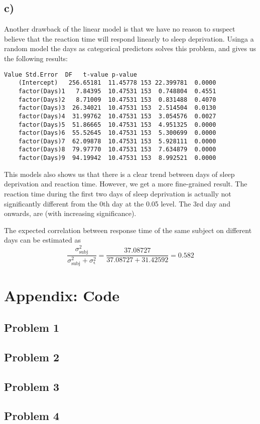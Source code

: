 \documentclass[a4paper, twocolumn]{article}
\begin{document}
\subsection*{c)}
Another drawback of the linear model is that we have no reason to suspect believe that the reaction time will respond linearly to sleep deprivation. Usinga a random model the days as categorical predictors solves this problem, and gives us the following results:
\begin{Verbatim}[fontsize=\scriptsize]
                    Value Std.Error  DF   t-value p-value
    (Intercept)   256.65181  11.45778 153 22.399781  0.0000
    factor(Days)1   7.84395  10.47531 153  0.748804  0.4551
    factor(Days)2   8.71009  10.47531 153  0.831488  0.4070
    factor(Days)3  26.34021  10.47531 153  2.514504  0.0130
    factor(Days)4  31.99762  10.47531 153  3.054576  0.0027
    factor(Days)5  51.86665  10.47531 153  4.951325  0.0000
    factor(Days)6  55.52645  10.47531 153  5.300699  0.0000
    factor(Days)7  62.09878  10.47531 153  5.928111  0.0000
    factor(Days)8  79.97770  10.47531 153  7.634879  0.0000
    factor(Days)9  94.19942  10.47531 153  8.992521  0.0000
\end{Verbatim}

This models also shows us that there is a clear trend between days of sleep deprivation and reaction time. However, we get a more fine-grained result. The reaction time during the first two days of sleep deprivation is actually not significantly different from the 0th day at the 0.05 level. The 3rd day and onwards, are (with increasing significance).

The expected correlation between response time of the same subject on different days can be estimated as
\begin{equation}
    \frac{\sigma_\mathrm{subj}^2}{\sigma_\mathrm{subj}^2 + \sigma_\mathrm{\epsilon}^2} = \frac{37.08727}{37.08727 + 31.42592} = 0.582
\end{equation}

\newpage
\onecolumn
\section*{Appendix: Code}
\subsection*{Problem 1}

\subsection*{Problem 2}

\subsection*{Problem 3}

\subsection*{Problem 4}

\end{document}
